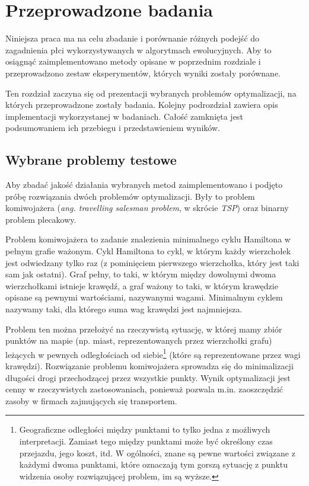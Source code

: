 \documentclass[./FM_mgr.tex]{subfiles}
\begin{document}
\chapter{Przeprowadzone badania} \label{chapter:experiments}

Niniejsza praca ma na celu zbadanie i porównanie różnych podejść do zagadnienia płci wykorzystywanych w algorytmach ewolucyjnych.
Aby to osiągnąć zaimplementowano metody opisane w poprzednim rozdziale i przeprowadzono zestaw eksperymentów, których wyniki zostały porównane.

Ten rozdział zaczyna się od prezentacji wybranych problemów optymalizacji, na których przeprowadzone zostały badania. Kolejny podrozdział zawiera opis implementacji wykorzystanej w badaniach. Całość zamknięta jest podsumowaniem ich przebiegu i przedstawieniem wyników.

\section{Wybrane problemy testowe}

Aby zbadać jakość działania wybranych metod zaimplementowano i podjęto próbę rozwiązania dwóch problemów optymalizacji. 
Były to problem komiwojażera (\emph{ang. travelling salesman problem}, w skrócie \emph{TSP}) oraz binarny problem plecakowy.

Problem komiwojażera to zadanie znalezienia minimalnego cyklu Hamiltona w pełnym grafie ważonym. 
Cykl Hamiltona to cykl, w którym każdy wierzchołek jest odwiedzany tylko raz (z pominięciem pierwszego wierzchołka, który jest taki sam jak ostatni). 
Graf pełny, to taki, w którym między dowolnymi dwoma wierzchołkami istnieje krawędź, a graf ważony to taki, w którym krawędzie opisane są pewnymi wartościami, nazywanymi wagami. 
Minimalnym cyklem nazywamy taki, dla którego suma wag krawędzi jest najmniejsza.

Problem ten można przełożyć na rzeczywistą sytuację, w której mamy zbiór punktów na mapie (np. miast, reprezentowanych przez wierzchołki grafu) leżących w pewnych odległościach od siebie\footnote{
	Geograficzne odległości między punktami to tylko jedna z możliwych interpretacji.
	Zamiast tego między punktami może być określony czas przejazdu, jego koszt, itd.
	W ogólności, znane są pewne wartości związane z każdymi dwoma punktami, które oznaczają tym gorszą sytuację z punktu widzenia osoby rozwiązującej problem, im są wyższe.
} (które są reprezentowane przez wagi krawędzi). 
Rozwiązanie problemu komiwojażera sprowadza się do minimalizacji długości drogi przechodzącej przez wszystkie punkty. 
Wynik optymalizacji jest cenny w rzeczywistych zastosowaniach, ponieważ pozwala m.in. zaoszczędzić zasoby w firmach zajmujących się transportem.
\end{document}
